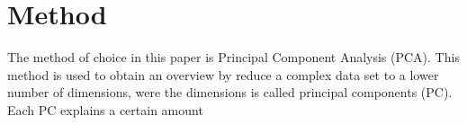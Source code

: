 \section*{Method}
\label{Method}
%
The method of choice in this paper is Principal Component Analysis (PCA). This method is used to obtain an overview by reduce a complex data set to a lower number of dimensions, were the dimensions is called principal components (PC). Each PC explains a certain amount 